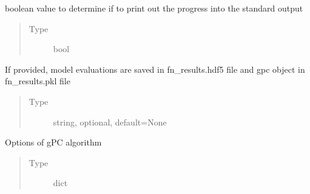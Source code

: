 \documentclass[letterpaper,10pt,english,openany,oneside]{sphinxmanual}
\begin{document}
\begin{fulllineitems}
\begin{fulllineitems}
\begin{quote}
\begin{description}
\end{description}\end{quote}

\end{fulllineitems}


\begin{fulllineitems}
\label{\detokenize{pygpc:pygpc.GPC.GPC.verbose}}
boolean value to determine if to print out the progress into the standard output
\begin{quote}\begin{description}
\item[{Type}] \leavevmode
bool

\end{description}\end{quote}

\end{fulllineitems}


\begin{fulllineitems}
\label{\detokenize{pygpc:pygpc.GPC.GPC.fn_results}}
If provided, model evaluations are saved in fn\_results.hdf5 file and gpc object in fn\_results.pkl file
\begin{quote}\begin{description}
\item[{Type}] \leavevmode
string, optional, default=None

\end{description}\end{quote}

\end{fulllineitems}


\begin{fulllineitems}
\label{\detokenize{pygpc:pygpc.GPC.GPC.options}}
Options of gPC algorithm
\begin{quote}\begin{description}
\item[{Type}] \leavevmode
dict


\end{description}
\end{quote}
\end{fulllineitems}
\end{fulllineitems}
\end{document}
